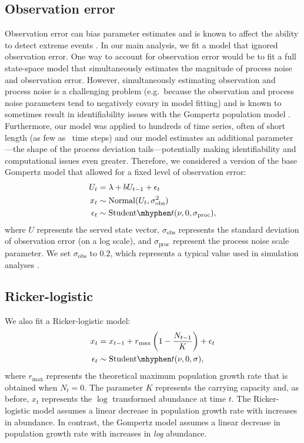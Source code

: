 \documentclass[12pt]{article}
\begin{document}
\subsection{Observation error} Observation error can bias parameter
estimates \citep{knape2012} and is known to affect the ability to detect extreme
events \citep{ward2007}. In our main analysis, we fit a model that ignored
observation error. One way to account for observation error would be to fit a
full state-space model that simultaneously estimates the magnitude of process
noise and observation error. However, simultaneously estimating observation and
process noise is a challenging problem (e.g.\ because the observation and
process noise parameters tend to negatively covary in model fitting) and is
known to sometimes result in identifiability issues with the Gompertz
population model \citep{knape2008}. Furthermore, our model was applied to
hundreds of time series, often of short length (as few as \minTimeSteps\ time
steps) and our model estimates an additional parameter---the shape of the
process deviation tails---potentially making identifiability and computational
issues even greater. Therefore, we considered a version of the base Gompertz
model that allowed for a fixed level of observation error:
\begin{align}
U_t &= \lambda + b U_{t-1} + \epsilon_t\\
x_t &\sim \mathrm{Normal}(U_t, \sigma_\mathrm{obs}^2)\\
\epsilon_t &\sim \mathrm{Student}\mhyphen t(\nu, 0, \sigma_\mathrm{proc}),
\end{align}
where \(U\) represents the served state vector, \(\sigma_\mathrm{obs}\)
represents the standard deviation of observation error (on a log scale), and
\(\sigma_\mathrm{proc}\) represent the process noise scale parameter. We set
\(\sigma_\mathrm{obs}\) to \(0.2\), which represents a typical value used in
simulation analyses \citep{valpine2002, thorson2014b}.

\subsection{Ricker-logistic} We also fit a Ricker-logistic model:
\begin{align}
x_t &= x_{t-1} + r_{\mathrm{max}}\left(1 - \frac{N_{t-1}}{K}\right) + \epsilon_t\\
\epsilon_t &\sim \mathrm{Student}\mhyphen t(\nu, 0, \sigma),
\end{align}
where \(r_\mathrm{max}\) represents the theoretical maximum population growth
rate that is obtained when \(N_t = 0\). The parameter \(K\) represents the
carrying capacity and, as before, \(x_t\) represents the \(\log\) transformed
abundance at time \(t\). The Ricker-logistic model assumes a linear decrease in
population growth rate with increases in abundance. In contrast, the Gompertz
model assumes a linear decrease in population growth rate with increases in
\textit{log} abundance.
\end{document}
